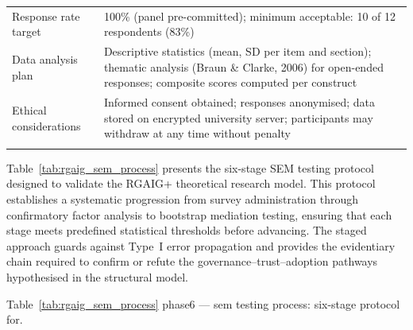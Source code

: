 \begin{xltabular}{\textwidth}{@{} l X @{}}
\addlinespace
Response rate target     & 100\% (panel pre-committed); minimum acceptable: 10 of 12 respondents (83\%) \\
\addlinespace
Data analysis plan       & Descriptive statistics (mean, SD per item and section); thematic analysis (Braun \& Clarke, 2006) for open-ended responses; composite scores computed per construct \\
\addlinespace
Ethical considerations   & Informed consent obtained; responses anonymised; data stored on encrypted university server; participants may withdraw at any time without penalty \\
\addlinespace
\midrule
{} \\
\end{xltabular}
\endgroup

\vspace{1.5em}


Table~\ref{tab:rgaig_sem_process} presents the six-stage SEM testing protocol designed to validate the RGAIG+ theoretical research model. This protocol establishes a systematic progression from survey administration through confirmatory factor analysis to bootstrap mediation testing, ensuring that each stage meets predefined statistical thresholds before advancing. The staged approach guards against Type~I error propagation and provides the evidentiary chain required to confirm or refute the governance--trust--adoption pathways hypothesised in the structural model.

\begingroup\singlespacing\tablefontsize\tablestripes
\noindent Table~\ref{tab:rgaig_sem_process} phase6 --- sem testing process: six-stage protocol for.


